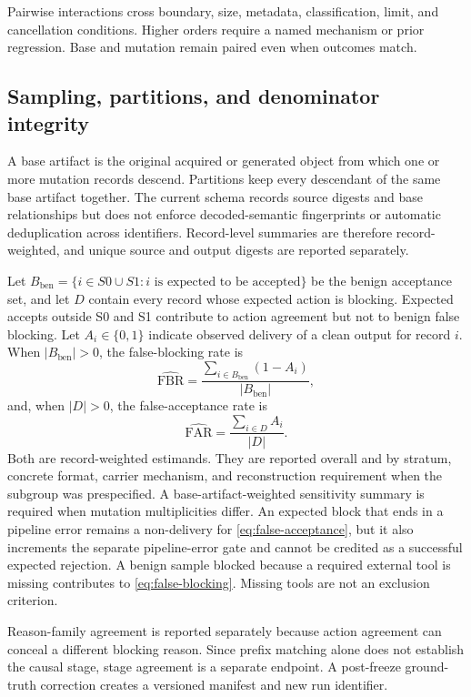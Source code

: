 Pairwise interactions cross boundary, size, metadata, classification, limit,
and cancellation conditions. Higher orders require a named mechanism or prior
regression. Base and mutation remain paired even when outcomes match.

\subsection{Sampling, partitions, and denominator integrity}
\label{subsec:corpus-denominators}

A base artifact is the original acquired or generated object from which one or
more mutation records descend. Partitions keep every descendant of the same
base artifact together. The current schema records source digests and base
relationships but does not enforce decoded-semantic fingerprints or automatic
deduplication across identifiers. Record-level summaries are therefore
record-weighted, and unique source and output digests are reported separately.

Let \(B_{\mathrm{ben}}=\{i\in S0\cup S1:\text{$i$ is expected to be
accepted}\}\) be the benign acceptance set, and let $D$ contain every record
whose expected action is blocking. Expected accepts outside S0 and S1 contribute
to action agreement but not to benign false blocking. Let
\(A_i\in\{0,1\}\) indicate observed delivery of a clean output for record
\(i\). When \(|B_{\mathrm{ben}}|>0\), the false-blocking rate is
\begin{equation}
 \widehat{\mathrm{FBR}}=
 \frac{\sum_{i\in B_{\mathrm{ben}}}(1-A_i)}{|B_{\mathrm{ben}}|},
 \label{eq:false-blocking}
\end{equation}
and, when \(|D|>0\), the false-acceptance rate is
\begin{equation}
 \widehat{\mathrm{FAR}}=
 \frac{\sum_{i\in D}A_i}{|D|}.
 \label{eq:false-acceptance}
\end{equation}
Both are record-weighted estimands. They are reported overall and by stratum,
concrete format, carrier mechanism, and reconstruction requirement when the
subgroup was prespecified. A base-artifact-weighted sensitivity summary is
required when mutation multiplicities differ. An
expected block that ends in a pipeline error remains a non-delivery for
\cref{eq:false-acceptance}, but it also increments the separate pipeline-error
gate and cannot be credited as a successful expected rejection. A benign sample
blocked because a required external tool is missing contributes to
\cref{eq:false-blocking}. Missing tools are not an exclusion criterion.

Reason-family agreement is reported separately because action agreement can
conceal a different blocking reason. Since prefix matching alone does not
establish the causal stage, stage agreement is a separate endpoint. A
post-freeze ground-truth correction creates a versioned manifest and new run
identifier.
